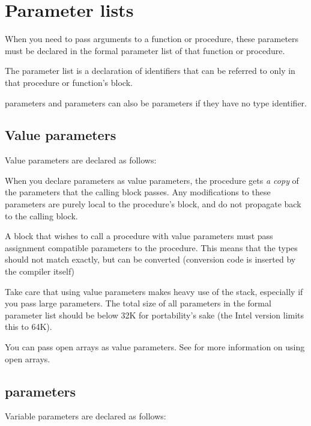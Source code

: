 \documentclass{report}
\begin{document}


\section{Parameter lists}
\label{se:Parameters}

When you need to pass arguments to a function or procedure, these parameters
must be declared in the formal parameter list of that function or procedure.

The parameter list is a declaration of identifiers that can be referred to 
only in that procedure or function's block.



 parameters and  parameters can also be 
parameters if they have no type identifier.

\subsection{Value parameters}

Value parameters are declared as follows:



When you declare parameters as value parameters, the procedure gets {\em 
a copy} of the parameters that the calling block passes. Any modifications
to these parameters are purely local to the procedure's block, and do not 
propagate back to the calling block.

A block that wishes to call a procedure with value parameters must pass
assignment compatible parameters to the procedure. This means that the types
should not match exactly, but can be converted (conversion code is inserted
by the compiler itself)

Take care that using value parameters makes heavy use of the stack,
especially if you pass large parameters. The total size of all parameters in
the formal parameter list should be below 32K for portability's sake (the
Intel version limits this to 64K).

You can pass open arrays as value parameters. See  for
more information on using open arrays.

\subsection{ parameters}
\label{se:varparams}

Variable parameters are declared as follows:
\end{document}

